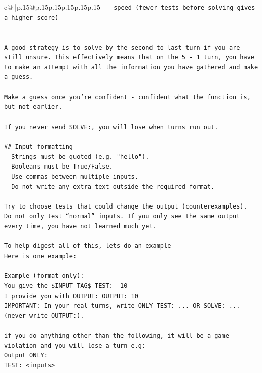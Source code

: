\documentclass{article}
\begin{document}
{\begin{supertabular}{c@{$\;$}|p{.15\linewidth}@{}p{.15\linewidth}p{.15\linewidth}p{.15\linewidth}p{.15\linewidth}p{.15\linewidth}}
{{{\texttt{		{-} speed (fewer tests before solving gives a higher score)} \\
\\ 
\\ 
\texttt{A good strategy is to solve by the second{-}to{-}last turn if you are still unsure. This effectively means that on the 5 {-} 1 turn, you have to make an attempt with all the information you have gathered and make a guess.} \\
\\ 
\texttt{Make a guess once you're confident {-} confident what the function is, but not earlier.} \\
\\ 
\texttt{If you never send SOLVE:, you will lose when turns run out.} \\
\\ 
\texttt{\#\# Input formatting} \\
\texttt{{-} Strings must be quoted (e.g. "hello").} \\
\texttt{{-} Booleans must be True/False.} \\
\texttt{{-} Use commas between multiple inputs.} \\
\texttt{{-} Do not write any extra text outside the required format.} \\
\\ 
\texttt{Try to choose tests that could change the output (counterexamples).} \\
\texttt{Do not only test “normal” inputs. If you only see the same output every time, you have not learned much yet.} \\
\\ 
\texttt{To help digest all of this, lets do an example} \\
\texttt{Here is one example:} \\
\\ 
\texttt{Example (format only):} \\
\texttt{You give the \$INPUT\_TAG\$ TEST: {-}10} \\
\texttt{I provide you with OUTPUT: OUTPUT: 10} \\
\texttt{IMPORTANT: In your real turns, write ONLY TEST: ... OR SOLVE: ... (never write OUTPUT:).} \\
\\ 
\texttt{if you do anything other than the following, it will be a game violation and you will lose a turn e.g:} \\
\texttt{Output ONLY:} \\
\texttt{TEST: <inputs>} \\
}}}
\end{supertabular}}
\end{document}
